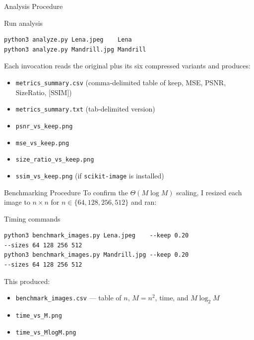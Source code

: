 \documentclass[12pt]{beamer}
\begin{document}
\begin{frame}[fragile]{Analysis Procedure}
  \begin{block}{Run analysis}
\begin{verbatim}
python3 analyze.py Lena.jpeg    Lena
python3 analyze.py Mandrill.jpg Mandrill
\end{verbatim}
  \end{block}

  Each invocation reads the original plus its six compressed variants and produces:
  \begin{itemize}
    \item \texttt{metrics\_summary.csv} \quad (comma‐delimited table of keep, MSE, PSNR, SizeRatio, [SSIM])  
    \item \texttt{metrics\_summary.txt} \quad (tab‐delimited version)  
    \item \texttt{psnr\_vs\_keep.png}  
    \item \texttt{mse\_vs\_keep.png}  
    \item \texttt{size\_ratio\_vs\_keep.png}  
    \item \texttt{ssim\_vs\_keep.png} \quad (if \texttt{scikit‑image} is installed)  
  \end{itemize}
\end{frame}






\begin{frame}[fragile]{Benchmarking Procedure}
  \small
  To confirm the \(\Theta(M\log M)\) scaling, I resized each image to \(n \times n\) for 
  \(n \in \{64,128,256,512\}\) and ran:
  \begin{block}{Timing commands}
\begin{verbatim}
python3 benchmark_images.py Lena.jpeg    --keep 0.20 
--sizes 64 128 256 512
python3 benchmark_images.py Mandrill.jpg --keep 0.20 
--sizes 64 128 256 512
\end{verbatim}
  \end{block}
  This produced:
  \begin{itemize}
    \item \texttt{benchmark\_images.csv}   — table of \(n\), \(M=n^2\), time, and \(M\log_2M\)  
    \item \texttt{time\_vs\_M.png}  
    \item \texttt{time\_vs\_MlogM.png}  
  \end{itemize}
\end{frame}
\end{document}
